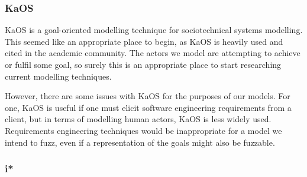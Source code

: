 \documentclass[11pt, twocolumn]{article}
\begin{document}
\subsubsection{KaOS} 
KaOS is a goal-oriented modelling technique for sociotechnical systems modelling\cite{Werneck2009}. This seemed like an appropriate place to begin, as KaOS is heavily used and cited in the academic community. The actors we model are attempting to achieve or fulfil some goal, so surely this is an appropriate place to start researching current modelling techniques.\par

However, there are some issues with KaOS for the purposes of our models. For one, KaOS is useful if one must elicit software engineering requirements from a client, but in terms of modelling human actors, KaOS is less widely used. Requirements engineering techniques would be inappropriate for a model we intend to fuzz, even if a representation of the goals might also be fuzzable. \par 

\subsubsection{i*}
\end{document}
